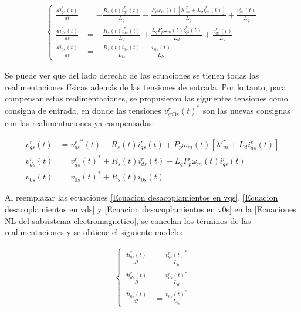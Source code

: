 \documentclass[a4paper, 10pt, onecolumn,journal]{ieeeconf}
\begin{document}
\begin{align}
	\begin{cases}
		\frac{d i^r_{qs}(t)}{dt} &= -\frac{R_s(t) i^r_{qs}(t)}{L_q} - \frac{P_p \omega_m(t) \left[\lambda'^r_m + L_d i^r_{ds}(t)\right]}{L_q} + \frac{v^r_{qs}(t)}{L_q}\\
		\frac{d i^r_{ds}(t)}{dt} &= -\frac{R_s(t) i^r_{ds}(t)}{L_d} + \frac{L_q P_p \omega_m(t)i^r_{qs}(t)}{L_d}  + \frac{v^r_{ds}(t)}{L_d} \\ 
		\frac{d i_{0s}(t)}{dt}   &= -\frac{R_s(t) i_{0s}(t)}{L_{ls}} + \frac{v_{0s}(t)}{L_{ls}}
	\end{cases}	\label{Ecuaciones NL del subsistema electromagnetico}
\end{align}

Se puede ver que del lado derecho de las ecuaciones se tienen todas las realimentaciones físicas además de las tensiones de entrada. Por lo tanto, para compensar estas realimentaciones, se propusieron las siguientes tensiones como consigna de entrada, en donde las tensiones  ${v^r_{qd0s}(t)}^*$ son las nuevas consignas con las realimentaciones ya compensadas:
 
 \begin{align}
 	v^r_{qs}(t) &= {v^r_{qs}}^*(t) + R_s(t) i^r_{qs}(t) + P_p \omega_m(t) \left[\lambda'^r_m + L_d i^r_{ds}(t)\right] \label{Ecuacion desacoplamientos en vqs}\\
 	v^r_{ds}(t) &= {v^r_{ds}(t)}^* + R_s(t) i^r_{ds}(t) - L_q P_p \omega_m(t)i^r_{qs}(t) \label{Ecuacion desacoplamientos en vds}\\ 
 	v_{0s}(t)   &= {v_{0s}(t)}^* + R_s(t) i_{0s}(t) \label{Ecuacion desacoplamientos en v0s}
 \end{align}

Al reemplazar las ecuaciones \eqref{Ecuacion desacoplamientos en vqs}, \eqref{Ecuacion desacoplamientos en vds} y \eqref{Ecuacion desacoplamientos en v0s} en la \cref{Ecuaciones NL del subsistema electromagnetico}, se cancelan los términos de las realimentaciones y se obtiene el siguiente modelo:

\begin{align}
	\begin{cases}
		\frac{d i^r_{qs}(t)}{dt} &= \frac{{v^r_{qs}(t)}^*}{L_q}\\
		\frac{d i^r_{ds}(t)}{dt} &= \frac{{v^r_{ds}(t)}^*}{L_d} \\ 
		\frac{d i_{0s}(t)}{dt}   &= \frac{{v_{0s}(t)}^*}{L_{ls}}
	\end{cases}	\label{Ecuaciones del subsistema electromagnetico sin realimentaciones fisicas}
\end{align}
\end{document}
